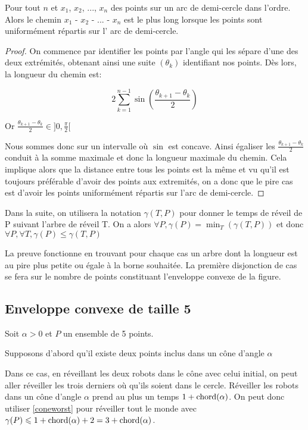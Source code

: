 \begin{lemma}\label{worstchord}
Pour tout $n$ et $x_1$, $x_2$, ..., $x_n$ des points sur un arc de demi-cercle dans l'ordre. Alors le chemin $x_1$ - $x_2$ - ... - $x_n$ est le plus long lorsque les points sont uniformément répartis sur l' arc de demi-cercle.
\end{lemma}
\begin{proof}
On commence par identifier les points par l'angle qui les sépare d'une des deux extrémités, obtenant ainsi une suite $\left(\theta_k\right)$ identifiant nos points. Dès lors, la longueur du chemin est:

$$2\sum_{k=1}^{n-1} \sin\left(\frac{\theta_{k+1} - \theta_k}{2}\right)$$

Or $\frac{\theta_{k+1} - \theta_k}{2} \in ]0, \frac{\pi}{2}[$

Nous sommes donc sur un intervalle où $\sin$ est concave. Ainsi égaliser les $\frac{\theta_{k+1} - \theta_k}{2}$ conduit à la somme maximale et donc la longueur maximale du chemin. 
Cela implique alors que la distance entre tous les points est la même et vu qu'il est toujours préférable d'avoir des points aux extremités, on a donc que le pire cas est d'avoir les points uniformément répartis sur l'arc de demi-cercle.

\end{proof}

Dans la suite, on utilisera la notation $\gamma(T, P)$ pour donner le temps de réveil de P suivant l'arbre de réveil T.
On a alors $\forall P, \gamma(P) = \min_T(\gamma(T,P))$
et donc $\forall P, \forall T, \gamma(P) \leq \gamma(T, P)$

La preuve fonctionne en trouvant pour chaque cas un arbre dont la longueur est au pire plus petite ou égale à la borne souhaitée. La première disjonction de cas se fera sur le nombre de points constituant l'enveloppe convexe de la figure.

\subsection{Enveloppe convexe de taille 5}\label{conv5}

Soit $\alpha > 0$ et $P$ un ensemble de 5 points.

\begin{lemma}\label{conealphachord}
Supposons d'abord qu'il existe deux points inclus dans un cône d'angle $\alpha$

Dans ce cas, en réveillant les deux robots dans le cône avec celui initial, on peut aller réveiller les trois derniers où qu'ils soient dans le cercle. Réveiller les robots dans un cône d'angle $\alpha$ prend au plus un temps $1 + \operatorname{chord}(\alpha)$.
On peut donc utiliser \cref{coneworst} pour réveiller tout le monde avec $\gamma(P) \leqslant 1 + \operatorname{chord}(\alpha) + 2 = 3 + \operatorname{chord}(\alpha)$.
\end{lemma}

